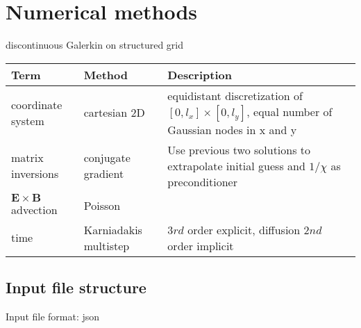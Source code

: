 \documentclass{hitec} %
\newcommand{\ExB}{$\bm{E}\times\bm{B} \,$}
\begin{document}
\section{Numerical methods}
discontinuous Galerkin on structured grid 
\begin{longtable}{ll>{\RaggedRight}p{7cm}}
\toprule
\rowcolor{gray!50}\textbf{Term} &  \textbf{Method} & \textbf{Description}  \\ \midrule
coordinate system & cartesian 2D & equidistant discretization of $[0,l_x] \times [0,l_y]$, equal number of Gaussian nodes in x and y \\
matrix inversions & conjugate gradient & Use previous two solutions to extrapolate initial guess and $1/\chi$ as preconditioner \\
\ExB advection & Poisson & \\
time &  Karniadakis multistep & $3rd$ order explicit, diffusion $2nd$ order implicit \\
\bottomrule
\end{longtable}
\subsection{Input file structure}
Input file format: json
\end{document}
